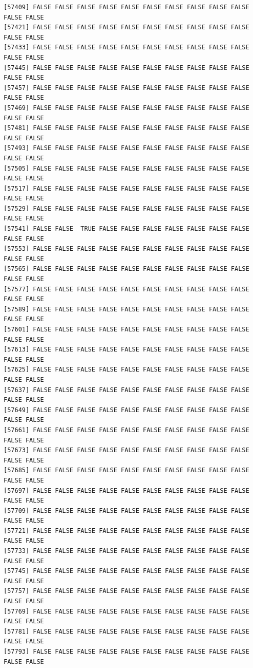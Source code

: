 \documentclass[
  a4paper,
  DIV=11,
  numbers=noendperiod]{scrartcl}
\begin{document}
\begin{verbatim}
[57409] FALSE FALSE FALSE FALSE FALSE FALSE FALSE FALSE FALSE FALSE FALSE FALSE
[57421] FALSE FALSE FALSE FALSE FALSE FALSE FALSE FALSE FALSE FALSE FALSE FALSE
[57433] FALSE FALSE FALSE FALSE FALSE FALSE FALSE FALSE FALSE FALSE FALSE FALSE
[57445] FALSE FALSE FALSE FALSE FALSE FALSE FALSE FALSE FALSE FALSE FALSE FALSE
[57457] FALSE FALSE FALSE FALSE FALSE FALSE FALSE FALSE FALSE FALSE FALSE FALSE
[57469] FALSE FALSE FALSE FALSE FALSE FALSE FALSE FALSE FALSE FALSE FALSE FALSE
[57481] FALSE FALSE FALSE FALSE FALSE FALSE FALSE FALSE FALSE FALSE FALSE FALSE
[57493] FALSE FALSE FALSE FALSE FALSE FALSE FALSE FALSE FALSE FALSE FALSE FALSE
[57505] FALSE FALSE FALSE FALSE FALSE FALSE FALSE FALSE FALSE FALSE FALSE FALSE
[57517] FALSE FALSE FALSE FALSE FALSE FALSE FALSE FALSE FALSE FALSE FALSE FALSE
[57529] FALSE FALSE FALSE FALSE FALSE FALSE FALSE FALSE FALSE FALSE FALSE FALSE
[57541] FALSE FALSE  TRUE FALSE FALSE FALSE FALSE FALSE FALSE FALSE FALSE FALSE
[57553] FALSE FALSE FALSE FALSE FALSE FALSE FALSE FALSE FALSE FALSE FALSE FALSE
[57565] FALSE FALSE FALSE FALSE FALSE FALSE FALSE FALSE FALSE FALSE FALSE FALSE
[57577] FALSE FALSE FALSE FALSE FALSE FALSE FALSE FALSE FALSE FALSE FALSE FALSE
[57589] FALSE FALSE FALSE FALSE FALSE FALSE FALSE FALSE FALSE FALSE FALSE FALSE
[57601] FALSE FALSE FALSE FALSE FALSE FALSE FALSE FALSE FALSE FALSE FALSE FALSE
[57613] FALSE FALSE FALSE FALSE FALSE FALSE FALSE FALSE FALSE FALSE FALSE FALSE
[57625] FALSE FALSE FALSE FALSE FALSE FALSE FALSE FALSE FALSE FALSE FALSE FALSE
[57637] FALSE FALSE FALSE FALSE FALSE FALSE FALSE FALSE FALSE FALSE FALSE FALSE
[57649] FALSE FALSE FALSE FALSE FALSE FALSE FALSE FALSE FALSE FALSE FALSE FALSE
[57661] FALSE FALSE FALSE FALSE FALSE FALSE FALSE FALSE FALSE FALSE FALSE FALSE
[57673] FALSE FALSE FALSE FALSE FALSE FALSE FALSE FALSE FALSE FALSE FALSE FALSE
[57685] FALSE FALSE FALSE FALSE FALSE FALSE FALSE FALSE FALSE FALSE FALSE FALSE
[57697] FALSE FALSE FALSE FALSE FALSE FALSE FALSE FALSE FALSE FALSE FALSE FALSE
[57709] FALSE FALSE FALSE FALSE FALSE FALSE FALSE FALSE FALSE FALSE FALSE FALSE
[57721] FALSE FALSE FALSE FALSE FALSE FALSE FALSE FALSE FALSE FALSE FALSE FALSE
[57733] FALSE FALSE FALSE FALSE FALSE FALSE FALSE FALSE FALSE FALSE FALSE FALSE
[57745] FALSE FALSE FALSE FALSE FALSE FALSE FALSE FALSE FALSE FALSE FALSE FALSE
[57757] FALSE FALSE FALSE FALSE FALSE FALSE FALSE FALSE FALSE FALSE FALSE FALSE
[57769] FALSE FALSE FALSE FALSE FALSE FALSE FALSE FALSE FALSE FALSE FALSE FALSE
[57781] FALSE FALSE FALSE FALSE FALSE FALSE FALSE FALSE FALSE FALSE FALSE FALSE
[57793] FALSE FALSE FALSE FALSE FALSE FALSE FALSE FALSE FALSE FALSE FALSE FALSE

\end{verbatim}
\end{document}

